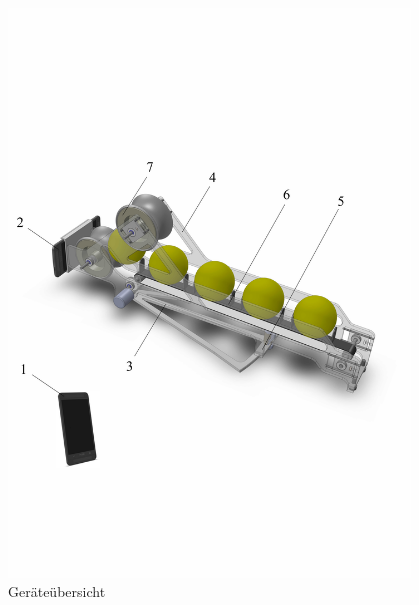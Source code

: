 \begin{figure}[h!]
		\centering
		\includegraphics[width=0.95\textwidth,clip,trim=5mm 55mm 15mm 80mm] {Enddokumentation/Loesungskonzept/Bilder/Beschreibung_Komponenten-edited.jpg}
		\caption{Geräteübersicht}
		\label{fig:Geraeteuebersicht}
\end{figure}
